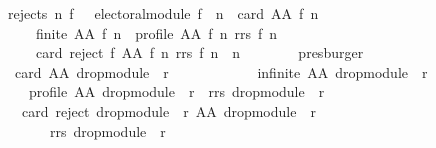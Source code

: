 \begin{isabellebody}
\ \ \ \ \ \ \ \ {\isacharparenleft}{\kern0pt}rejects\ n\ f\ {\isasymor}\ {\isasymnot}\ electoral{\isacharunderscore}{\kern0pt}module\ f\ {\isasymor}\ n\ {\isasymle}\ card\ {\isacharparenleft}{\kern0pt}AA\ f\ n{\isacharparenright}{\kern0pt}\ {\isasymand}\isanewline
\ \ \ \ \ \ \ \ \ \ \ \ finite\ {\isacharparenleft}{\kern0pt}AA\ f\ n{\isacharparenright}{\kern0pt}\ {\isasymand}\ profile\ {\isacharparenleft}{\kern0pt}AA\ f\ n{\isacharparenright}{\kern0pt}\ {\isacharparenleft}{\kern0pt}rrs\ f\ n{\isacharparenright}{\kern0pt}\ {\isasymand}\isanewline
\ \ \ \ \ \ \ \ \ \ \ \ card\ {\isacharparenleft}{\kern0pt}reject\ f\ {\isacharparenleft}{\kern0pt}AA\ f\ n{\isacharparenright}{\kern0pt}\ {\isacharparenleft}{\kern0pt}rrs\ f\ n{\isacharparenright}{\kern0pt}{\isacharparenright}{\kern0pt}\ {\isasymnoteq}\ n{\isacharparenright}{\kern0pt}{\isachardoublequoteclose}\isanewline
\ \ \ \ \ \ \isamarkupfalse%
\ presburger\isanewline
\ \ \ \ \isamarkupfalse%
\isanewline
\ \ \ \ \ \ {\isachardoublequoteopen}{\isasymnot}\ {}\ {\isasymle}\ card\ {\isacharparenleft}{\kern0pt}AA\ {\isacharparenleft}{\kern0pt}drop{\isacharunderscore}{\kern0pt}module\ {}\ r{\isacharparenright}{\kern0pt}\ {}{\isacharparenright}{\kern0pt}\ {\isasymor}\isanewline
\ \ \ \ \ \ \ \ \ \ infinite\ {\isacharparenleft}{\kern0pt}AA\ {\isacharparenleft}{\kern0pt}drop{\isacharunderscore}{\kern0pt}module\ {}\ r{\isacharparenright}{\kern0pt}\ {}{\isacharparenright}{\kern0pt}\ {\isasymor}\isanewline
\ \ \ \ \ \ \ \ \ \ {\isasymnot}\ profile\ {\isacharparenleft}{\kern0pt}AA\ {\isacharparenleft}{\kern0pt}drop{\isacharunderscore}{\kern0pt}module\ {}\ r{\isacharparenright}{\kern0pt}\ {}{\isacharparenright}{\kern0pt}\ {\isacharparenleft}{\kern0pt}rrs\ {\isacharparenleft}{\kern0pt}drop{\isacharunderscore}{\kern0pt}module\ {}\ r{\isacharparenright}{\kern0pt}\ {}{\isacharparenright}{\kern0pt}\ {\isasymor}\isanewline
\ \ \ \ \ \ \ \ \ \ card\ {\isacharparenleft}{\kern0pt}reject\ {\isacharparenleft}{\kern0pt}drop{\isacharunderscore}{\kern0pt}module\ {}\ r{\isacharparenright}{\kern0pt}\ {\isacharparenleft}{\kern0pt}AA\ {\isacharparenleft}{\kern0pt}drop{\isacharunderscore}{\kern0pt}module\ {}\ r{\isacharparenright}{\kern0pt}\ {}{\isacharparenright}{\kern0pt}\isanewline
\ \ \ \ \ \ \ \ \ \ \ \ \ \ {\isacharparenleft}{\kern0pt}rrs\ {\isacharparenleft}{\kern0pt}drop{\isacharunderscore}{\kern0pt}module\ {}\ r{\isacharparenright}{\kern0pt}\ {}{\isacharparenright}{\kern0pt}{\isacharparenright}{\kern0pt}\ {\isacharequal}{\kern0pt}\ {}{\isachardoublequoteclose}\isanewline

\end{isabellebody}
